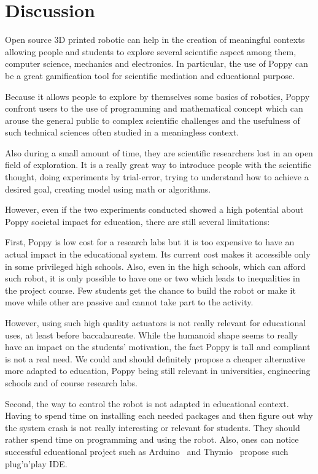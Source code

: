 \section{Discussion} %

Open source 3D printed robotic can help in the creation of meaningful contexts allowing people and students to explore several scientific aspect among them, computer science, mechanics and electronics. In particular, the use of Poppy can be a great gamification tool for scientific mediation and educational purpose.

Because it allows people to explore by themselves some basics of robotics, Poppy confront users to the use of programming and mathematical concept which can arouse the general public to complex scientific challenges and the usefulness of such technical sciences often studied in a meaningless context.

Also during a small amount of time, they are scientific researchers lost in an open field of exploration. It is a really great way to introduce people with the scientific thought, doing experiments by trial-error, trying to understand how to achieve a desired goal, creating model using math or algorithms.

However, even if the two experiments conducted showed a high potential about Poppy societal impact for education, there are still several limitations:

First, Poppy is low cost for a research labs but it is too expensive to have an actual impact in the educational system. Its current cost makes it accessible only in some privileged high schools. Also, even in the high schools, which can afford such robot, it is only possible to have one or two which leads to inequalities in the project course. Few students get the chance to build the robot or make it move while other are passive and cannot take part to the activity.

However, using such high quality actuators is not really relevant for educational uses, at least before baccalaureate. While the humanoid shape seems to really have an impact on the students’ motivation, the fact Poppy is tall and compliant is not a real need. We could and should definitely propose a cheaper alternative more adapted to education, Poppy being still relevant in universities, engineering schools and of course research labs.

Second, the way to control the robot is not adapted in educational context. Having to spend time on installing each needed packages and then figure out why the system crash is not really interesting or relevant for students. They should rather spend time on programming and using the robot. Also, ones can notice successful educational project such as Arduino~\cite{banzi2009getting} and Thymio~\cite{shin2014visual}  propose such plug'n'play IDE.

